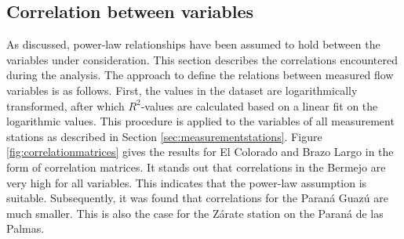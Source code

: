 \subsection{Correlation between variables}
\label{sec:correlation of variables}
As discussed, power-law relationships have been assumed to hold between the variables under consideration. This section describes the correlations encountered during the analysis. The approach to define the relations between measured flow variables is as follows. First, the values in the dataset are logarithmically transformed, after which $R^2$-values are calculated based on a linear fit on the logarithmic values. This procedure is applied to the variables of all measurement stations as described in Section \ref{sec:measurementstations}. Figure \ref{fig:correlationmatrices} gives the results for El Colorado and Brazo Largo in the form of correlation matrices. It stands out that correlations in the Bermejo are very high for all variables. This indicates that the power-law assumption is suitable. Subsequently, it was found that correlations for the Paraná Guazú are much smaller. This is also the case for the Zárate station on the Paraná de las Palmas.

